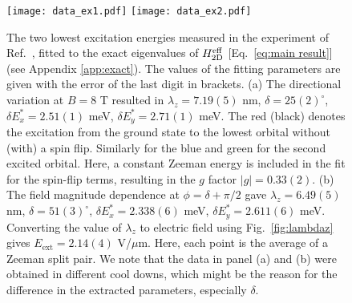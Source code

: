 \documentclass[aps,floatfix,twocolumn,showpacs,10pt,nofootinbib]{revtex4-1}
\begin{document}
\begin{figure}
\texttt{[image: data\_ex1.pdf]}
\texttt{[image: data\_ex2.pdf]}
\caption{\label{fig:data}
The two lowest excitation energies measured in the experiment of Ref.~, fitted to the exact eigenvalues of $H_{\rm 2D}^{\rm eff}$ [Eq.~\eqref{eq:main result}] (see Appendix \ref{app:exact}). The values of the fitting parameters are given with the error of the last digit in brackets. (a) The directional variation at $B = 8$ T resulted in $\lambda_z=7.19(5)$ nm, $\delta=25(2)^\circ$, $\delta E_x^* = 2.51(1)$ meV, $\delta E_y^* = 2.71(1)$ meV. The red (black) denotes the excitation from the ground state to the lowest orbital without (with) a spin flip. Similarly for the blue and green for the second excited orbital. Here, a constant Zeeman energy is included in the fit for the spin-flip terms, resulting in the $g$ factor $|g|=0.33(2)$.
(b) The field magnitude dependence at $\phi=\delta+\pi/2$ gave $\lambda_z=6.49(5)$ nm, $\delta=51(3)^\circ$, $\delta E_x^* = 2.338(6)$ meV, $\delta E_y^* = 2.611(6)$ meV. Converting the value of $\lambda_z$ to electric field using Fig.~\ref{fig:lambdaz} gives $E_{\textrm{ext}}=2.14(4)$ V/$\mu$m. Here, each point is the average of a Zeeman split pair. We note that the data in panel (a) and (b) were obtained in different cool downs, which might be the reason for the difference in the extracted parameters, especially $\delta$.}
\end{figure}
\end{document}

